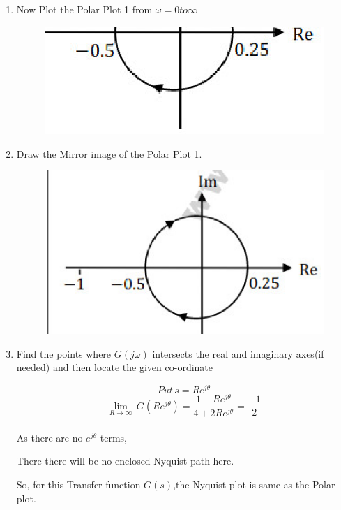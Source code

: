 \begin{enumerate}[label=\thesection.\arabic*.,ref=\thesection.\theenumi]
\item Now Plot the Polar Plot 1 from $\omega=0 to \infty$
\begin{figure}[!h]
  \includegraphics[width=\columnwidth]{./figs/image2.eps}
\end{figure}

\item Draw the Mirror image of the Polar Plot 1.
\begin{figure}[!h]
  \includegraphics[width=\columnwidth]{./figs/image1.eps}
 
\end{figure}


\item Find the points where $G(j\omega)$ intersects the real and imaginary axes(if needed) and then locate the given co-ordinate




    $$Put\,s=Re^{j\theta}$$
    $$\lim_{R\to \infty}\,G(Re^{j\theta})=\frac{1-Re^{j\theta}}{4+2Re^{j\theta}}=\frac{-1}{2}$$ \\
    \bigskip
    As there are no $e^{j\theta}$ terms, 
    
    There there will be no enclosed Nyquist path here. 
    
    So, for this Transfer function $G(s)$,the Nyquist plot is same as the Polar plot.
    

\end{enumerate}
